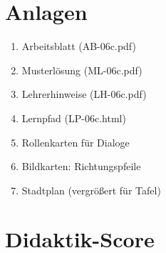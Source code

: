 \documentclass[11pt,a4paper]{article}
\begin{document}
\section{Anlagen}

\begin{enumerate}
    \item Arbeitsblatt (AB-06c.pdf)
    \item Musterlösung (ML-06c.pdf)
    \item Lehrerhinweise (LH-06c.pdf)
    \item Lernpfad (LP-06c.html)
    \item Rollenkarten für Dialoge
    \item Bildkarten: Richtungspfeile
    \item Stadtplan (vergrößert für Tafel)
\end{enumerate}

\newpage
\section{Didaktik-Score}
\end{document}
